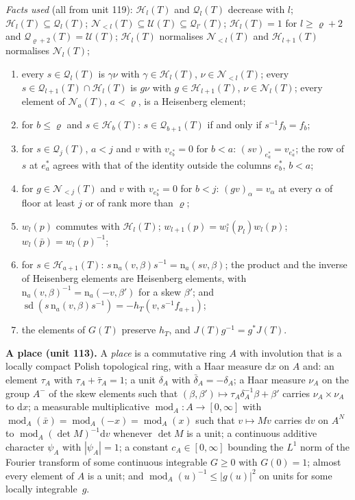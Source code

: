 \documentclass[11pt,a4paper]{article}
\newcommand{\subhead}[1]{\par\addvspace{9pt plus 2pt}\Needspace{4\baselineskip}\noindent\textbf{#1}\enspace\ignorespaces}
\theoremstyle{plainx}
\theoremstyle{uprightx}
\newcommand{\dd}{\mathrm{d}}
\newcommand{\GT}[1]{G(#1)}
\newcommand{\JT}[1]{J(#1)}
\newcommand{\Hl}[2]{\mathcal{H}_{#1}(#2)}
\newcommand{\Ql}[2]{\mathcal{Q}_{#1}(#2)}
\newcommand{\Nb}[2]{\mathcal{N}_{<#1}(#2)}
\newcommand{\Nf}[2]{\mathcal{N}_{#1}(#2)}
\newcommand{\UT}[1]{\mathcal{U}(#1)}
\newcommand{\modA}{\operatorname{mod}_A}
\newcommand{\sd}{\operatorname{sd}}
\newcommand{\wl}[2]{w_{#1}(#2)}
\newcommand{\wo}[2]{w^{\circ}_{#1}(#2)}
\begin{document}
\emph{Facts used} (all from unit 119): $\Hl{l}{T}$ and $\Ql{l}{T}$ decrease with $l$;
$\Hl{l}{T}\subseteq\Ql{l}{T}$; $\Nb{l}{T}\subseteq\UT{T}\subseteq\Ql{l'}{T}$; $\Hl{l}{T}=1$ for $l\ge\varrho+2$
and $\Ql{\varrho+2}{T}=\UT{T}$; $\Hl{l}{T}$ normalises $\Nb{l}{T}$ and $\Hl{l+1}{T}$ normalises $\Nf{l}{T}$;
\begin{enumerate}[label=\textup{(F\arabic*)}]
\item every $s\in\Ql{l}{T}$ is $\gamma\nu$ with $\gamma\in\Hl{l}{T}$, $\nu\in\Nb{l}{T}$; every
  $s\in\Ql{l+1}{T}\cap\Hl{l}{T}$ is $g\nu$ with $g\in\Hl{l+1}{T}$, $\nu\in\Nf{l}{T}$; every element of $\Nf{a}{T}$,
  $a<\varrho$, is a Heisenberg element;
\item for $b\le\varrho$ and $s\in\Hl{b}{T}$: $s\in\Ql{b+1}{T}$ if and only if $s^{-1}f_b=f_b$;
\item for $s\in\Ql{j}{T}$, $a<j$ and $v$ with $v_{e^*_b}=0$ for $b<a$: $(sv)_{e^*_a}=v_{e^*_a}$; the row of $s$ at
  $e^*_a$ agrees with that of the identity outside the columns $e^*_b$, $b<a$;
\item for $g\in\Nb{j}{T}$ and $v$ with $v_{e^*_b}=0$ for $b<j$: $(gv)_\alpha=v_\alpha$ at every $\alpha$ of floor at
  least $j$ or of rank more than $\varrho$;
\item $\wl{l}{p}$ commutes with $\Hl{l}{T}$; $\wl{l+1}{p}=\wo{l}{p_l}\wl{l}{p}$; $\wl{l}{\bar p}=\wl{l}{p}^{-1}$;
\item for $s\in\Hl{a+1}{T}$: $s\,\mathrm{n}_a(v,\beta)s^{-1}=\mathrm{n}_a(sv,\beta)$; the product and the inverse of
  Heisenberg elements are Heisenberg elements, with
  $\mathrm{n}_a(v,\beta)^{-1}=\mathrm{n}_a(-v,\beta')$ for a skew $\beta'$; and
  $\sd(s\,\mathrm{n}_a(v,\beta)s^{-1})=-h_T(v,s^{-1}f_{a+1})$;
\item the elements of $\GT{T}$ preserve $h_T$, and $\JT{T}g^{-1}=g^{*}\JT{T}$.
\end{enumerate}

\subhead{A place (unit 113).} A \emph{place} is a commutative ring $A$ with involution that is a locally compact
Polish topological ring, with a Haar measure $\dd x$ on $A$ and: an element $\tau_A$ with $\tau_A+\bar\tau_A=1$; a
unit $\delta_A$ with $\bar\delta_A=-\delta_A$; a Haar measure $\nu_A$ on the group $A^{-}$ of the skew elements such
that $(\beta,\beta')\mapsto\tau_A\delta_A^{-1}\beta+\beta'$ carries $\nu_A\times\nu_A$ to $\dd x$; a measurable
multiplicative $\modA\colon A\to[0,\infty]$ with $\modA(\bar x)=\modA(-x)=\modA(x)$ such that $v\mapsto Mv$ carries
$\dd v$ on $A^{N}$ to $\modA(\det M)^{-1}\dd v$ whenever $\det M$ is a unit; a continuous additive character
$\psi_A$ with $|\psi_A|=1$; a constant $c_A\in[0,\infty]$ bounding the $L^1$ norm of the Fourier transform of some
continuous integrable $G\ge0$ with $G(0)=1$; almost every element of $A$ is a unit; and $\modA(u)^{-1}\le|g(u)|^2$ on
units for some locally integrable~$g$.
\end{document}
